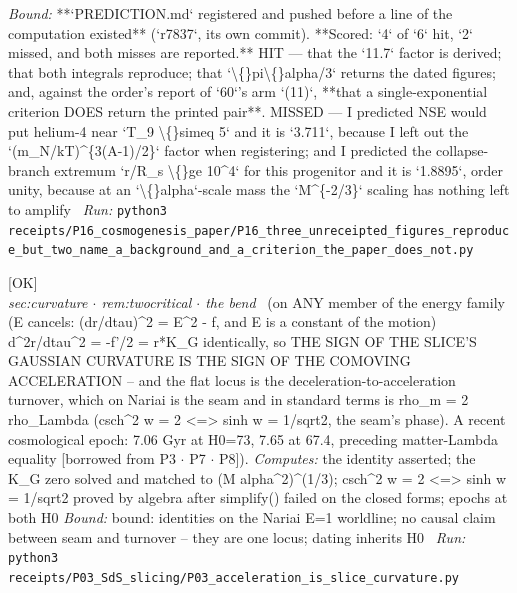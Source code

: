\begin{description}
 \emph{Bound:} **`PREDICTION.md` registered and pushed before a line of the computation existed** (`r7837`, its own commit). **Scored: `4` of `6` hit, `2` missed, and both misses are reported.** HIT --- that the `11.7` factor is derived; that both integrals reproduce; that `\textbackslash\{\}pi\textbackslash\{\}alpha/3` returns the dated figures; and, against the order's report of `60`'s arm `(11)`, **that a single-exponential criterion DOES return the printed pair**. MISSED --- I predicted NSE would put helium-4 near `T\_9 \textbackslash\{\}simeq 5` and it is `3.711`, because I left out the `(m\_N/kT)\textasciicircum{}\{3(A-1)/2\}` factor when registering; and I predicted the collapse-branch extremum `r/R\_s \textbackslash\{\}ge 10\textasciicircum{}4` for this progenitor and it is `1.8895`, order unity, because at an `\textbackslash\{\}alpha`-scale mass the `M\textasciicircum{}\{-2/3\}` scaling has nothing left to amplify
\ \emph{Run:} \texttt{python3 receipts/P16\_cosmogenesis\_paper/P16\_three\_unreceipted\_figures\_reproduce\_but\_two\_name\_a\_background\_and\_a\_criterion\_the\_paper\_does\_not.py}
\item[\rcptlabel{P03_acceleration_is_slice_curvature}{P3R12}\textbf{P3R12}\quad\texttt{P03\_acceleration\_is\_slice\_curvature}]\hfill\textsf{[OK]}\\
\textit{sec:curvature \ensuremath{\cdot} rem:twocritical \ensuremath{\cdot} the bend} \ (on ANY member of the energy family (E cancels: (dr/dtau)\textasciicircum{}2 = E\textasciicircum{}2 - f, and E is a constant of the motion) d\textasciicircum{}2r/dtau\textasciicircum{}2 = -f'/2 = r*K\_G identically, so THE SIGN OF THE SLICE'S GAUSSIAN CURVATURE IS THE SIGN OF THE COMOVING ACCELERATION -- and the flat locus is the deceleration-to-acceleration turnover, which on Nariai is the seam and in standard terms is rho\_m = 2 rho\_Lambda (csch\textasciicircum{}2 w = 2 <=> sinh w = 1/sqrt2, the seam's phase). A recent cosmological epoch: 7.06 Gyr at H0=73, 7.65 at 67.4, preceding matter-Lambda equality [borrowed from P3 \ensuremath{\cdot} P7 \ensuremath{\cdot} P8]). 
\emph{Computes:} the identity asserted; the K\_G zero solved and matched to (M alpha\textasciicircum{}2)\textasciicircum{}(1/3); csch\textasciicircum{}2 w = 2 <=> sinh w = 1/sqrt2 proved by algebra after simplify() failed on the closed forms; epochs at both H0
 \emph{Bound:} bound: identities on the Nariai E=1 worldline; no causal claim between seam and turnover -- they are one locus; dating inherits H0
\ \emph{Run:} \texttt{python3 receipts/P03\_SdS\_slicing/P03\_acceleration\_is\_slice\_curvature.py}

\end{description}
